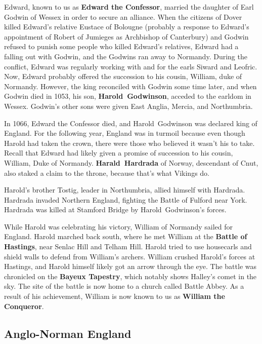 Edward, known to us as \textbf{Edward the Confessor},
married the daughter of Earl Godwin of Wessex in order to secure an alliance.
When the citizens of Dover killed Edward's relative Eustace of Bolougne
(probably a response to Edward's appointment of Robert of Jumieges as Archbishop of Canterbury)
and Godwin refused to punish some people who killed Edward's relatives,
Edward had a falling out with Godwin, and the Godwins ran away to Normandy.
During the conflict, Edward was regularly working with and for the earls Siward and Leofric.
Now, Edward probably offered the succession to his cousin, William, duke of Normandy.
However, the king reconciled with Godwin some time later, and when Godwin died in 1053,
his son, \textbf{Harold~Godwinson}, acceded to the earldom in Wessex.
Godwin's other sons were given East Anglia, Mercia, and Northumbria.

In 1066, Edward the Confessor died, and Harold~Godwinson was declared king of England.
For the following year, England was in turmoil because even though Harold had taken the crown,
there were those who believed it wasn't his to take.
Recall that Edward had likely given a promise of succession to his cousin, William, Duke of Normandy.
\textbf{Harald~Hardrada} of Norway, descendant of Cnut, also staked a claim to the throne,
because that's what Vikings do.

Harold's brother Tostig, leader in Northumbria, allied himself with Hardrada.
Hardrada invaded Northern England, fighting the Battle of Fulford near York.
Hardrada was killed at Stamford Bridge by Harold~Godwinson's forces.

While Harold was celebrating his victory, William of Normandy sailed for England.
Harold marched back south, where he met William at the \textbf{Battle of Hastings},
near Senlac Hill and Telham Hill.
Harold tried to use housecarls and shield walls to defend from William's archers.
William crushed Harold's forces at Hastings, and Harold himself likely got an arrow through the eye.
The battle was chronicled on the \textbf{Bayeux Tapestry}, which notably shows Halley's comet in the sky.
The site of the battle is now home to a church called Battle Abbey.
As a result of his achievement, William is now known to us as \textbf{William the Conqueror}.

\subsection*{Anglo-Norman England}

